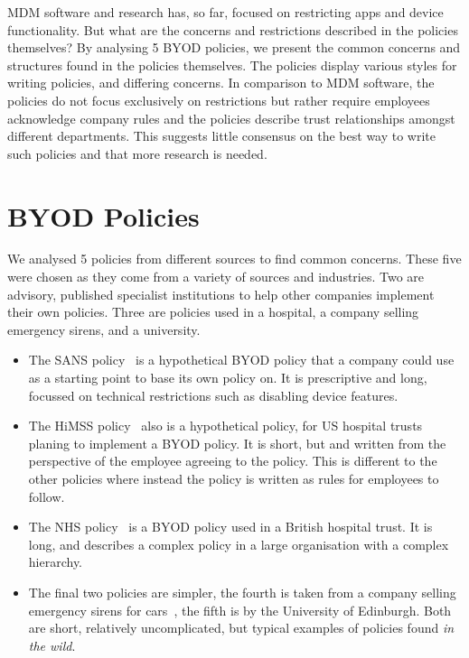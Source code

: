 \documentclass[conference,twocolumn]{IEEEtran}
\begin{document}
MDM software and research has, so far, focused on restricting apps and device functionality.
But what are the concerns and restrictions described in the policies themselves?
By analysing 5 BYOD policies, we present the common concerns and structures found in the policies themselves.
The policies display various styles for writing policies, and differing concerns.
In comparison to MDM software, the policies do not focus exclusively on restrictions but rather require employees acknowledge company rules and the policies describe trust relationships amongst different departments.
This suggests little consensus on the best way to write such policies and that more research is needed.

\section{BYOD Policies}
\label{sec:byod_policies}

We analysed 5 policies from different sources to find common concerns.
These five were chosen as they come from a variety of sources and industries.
Two are advisory, published specialist institutions to help other companies implement their own policies.
Three are policies used in a hospital, a company selling emergency sirens, and a university.
\begin{itemize}
  \item The SANS policy~\cite{nicholas_r._c._guerin_security_2008} is a hypothetical BYOD policy that a company could use as a starting point to base its own policy on.
    It is prescriptive and long, focussed on technical restrictions such as disabling device features.
  \item The HiMSS policy~\cite{healthcare_information_and_management_systems_society_mobile_2012} also is a hypothetical policy, for US hospital trusts planing to implement a BYOD policy.
    It is short, but and written from the perspective of the employee agreeing to the policy.
    This is different to the other policies where instead the policy is written as rules for employees to follow.
  \item The NHS policy~\cite{kennington_mobiles_2014} is a BYOD policy used in a British hospital trust.
    It is long, and describes a complex policy in a large organisation with a complex hierarchy.
  \item The final two policies are simpler, the fourth is taken from a company selling emergency sirens for cars~\cite{code3pse.org_sample_????}, the fifth is by the University of Edinburgh.
Both are short, relatively uncomplicated, but typical examples of policies found \emph{in the wild}.
\end{itemize}
\end{document}
